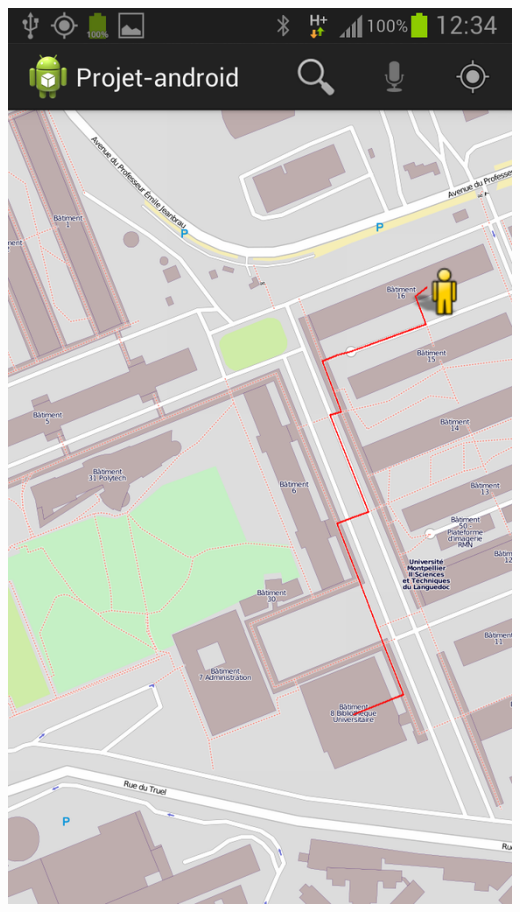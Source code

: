 \documentclass{article}
\begin{document}
	\begin{center}
		\includegraphics[scale=0.25]{guidage.png}
	\end{center}
	
\end{document}
